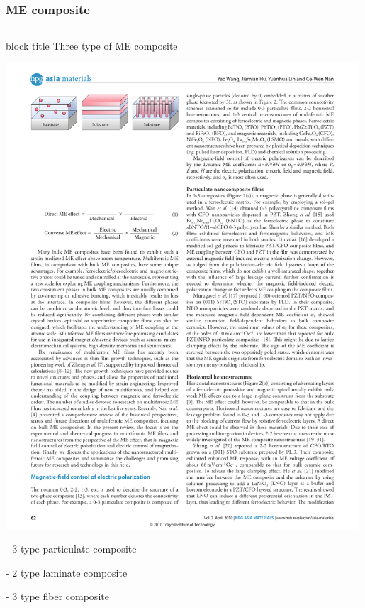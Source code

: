 \documentclass[compress]{beamer}
\begin{document}
\begin{frame}\frametitle{ME composite}
\begin{columns}[totalwidth=\textwidth] 
   \begin{column}{.99\textwidth} 
   \begin{beamercolorbox}[sep=8pt,center]{block title}
      Three type of ME composite
      \end{beamercolorbox}
   \includegraphics[width=0.99\textwidth]{Graphic/01_threetypecomposite.pdf}
   \begin{minipage}{0.32\textwidth}
    - 3 type particulate composite
	\end{minipage}
	\begin{minipage}{0.32\textwidth}
    - 2 type laminate composite
	\end{minipage}
	\begin{minipage}{0.32\textwidth}
    - 3 type fiber composite
	\end{minipage}
   \end{column}
\end{columns}
 \vspace{0.5cm}
\end{frame}
\end{document}
